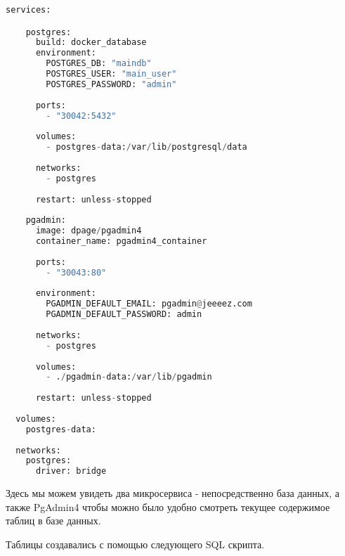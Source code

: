 \documentclass[12pt]{extarticle}
\begin{document}
\begin{lstlisting}[language=Python,style=mystyle,caption=class ReturningResultHandler]
    services:

    postgres:
      build: docker_database
      environment:
        POSTGRES_DB: "maindb"
        POSTGRES_USER: "main_user"
        POSTGRES_PASSWORD: "admin"
      
      ports:
        - "30042:5432"
  
      volumes:
        - postgres-data:/var/lib/postgresql/data
  
      networks:
        - postgres
  
      restart: unless-stopped
  
    pgadmin:
      image: dpage/pgadmin4
      container_name: pgadmin4_container
  
      ports:
        - "30043:80"
  
      environment:
        PGADMIN_DEFAULT_EMAIL: pgadmin@jeeeez.com
        PGADMIN_DEFAULT_PASSWORD: admin
  
      networks:
        - postgres
  
      volumes:
        - ./pgadmin-data:/var/lib/pgadmin
  
      restart: unless-stopped
  
  volumes:
    postgres-data:
  
  networks:
    postgres:
      driver: bridge  
\end{lstlisting}

Здесь мы можем увидеть два микросервиса - непосредственно база данных, а также PgAdmin4 чтобы можно было удобно смотреть текущее содержимое таблиц в базе данных.

Таблицы создавались с помощью следующего SQL скрипта.
\end{document}
